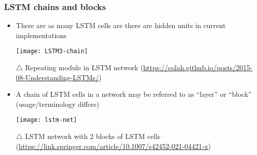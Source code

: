 \documentclass[smaller]{beamer}
\begin{document}
\begin{frame}
  \frametitle{LSTM chains and blocks}
  \pause

  \begin{itemize}
  \item There are as many LSTM cells are there are hidden units in current implementations\pe
    
    \begin{center}
      \texttt{[image: LSTM3-chain]}    

      {\footnotesize $\triangle$ Repeating module in LSTM network {\tiny (\url{https://colah.github.io/posts/2015-08-Understanding-LSTMs/})}}
    \end{center}
    \pe
  \item A chain of LSTM cells in a network may be referred to as ``layer'' or ``block'' (usage/terminology differs)
    \pe

  \begin{center}
    \texttt{[image: lstm-net]}

    {\footnotesize $\triangle$ LSTM network with 2 blocks of LSTM cells
      {\tiny (\url{https://link.springer.com/article/10.1007/s42452-021-04421-x})}}
  \end{center}
\end{itemize}

\end{frame}

\end{document}
